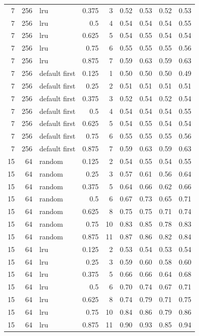 \begin{longtable}{@{}rrlrrrrrr@{}}
7 & 256 & lru & 0.375 & 3 & 0.52 & 0.53 & 0.52 & 0.53 \\
7 & 256 & lru & 0.5 & 4 & 0.54 & 0.54 & 0.54 & 0.55 \\
7 & 256 & lru & 0.625 & 5 & 0.54 & 0.55 & 0.54 & 0.54 \\
7 & 256 & lru & 0.75 & 6 & 0.55 & 0.55 & 0.55 & 0.56 \\
7 & 256 & lru & 0.875 & 7 & 0.59 & 0.63 & 0.59 & 0.63 \\
7 & 256 & default first & 0.125 & 1 & 0.50 & 0.50 & 0.50 & 0.49 \\
7 & 256 & default first & 0.25 & 2 & 0.51 & 0.51 & 0.51 & 0.51 \\
7 & 256 & default first & 0.375 & 3 & 0.52 & 0.54 & 0.52 & 0.54 \\
7 & 256 & default first & 0.5 & 4 & 0.54 & 0.54 & 0.54 & 0.55 \\
7 & 256 & default first & 0.625 & 5 & 0.54 & 0.55 & 0.54 & 0.54 \\
7 & 256 & default first & 0.75 & 6 & 0.55 & 0.55 & 0.55 & 0.56 \\
7 & 256 & default first & 0.875 & 7 & 0.59 & 0.63 & 0.59 & 0.63 \\
15 & 64 & random & 0.125 & 2 & 0.54 & 0.55 & 0.54 & 0.55 \\
15 & 64 & random & 0.25 & 3 & 0.57 & 0.61 & 0.56 & 0.64 \\
15 & 64 & random & 0.375 & 5 & 0.64 & 0.66 & 0.62 & 0.66 \\
15 & 64 & random & 0.5 & 6 & 0.67 & 0.73 & 0.65 & 0.71 \\
15 & 64 & random & 0.625 & 8 & 0.75 & 0.75 & 0.71 & 0.74 \\
15 & 64 & random & 0.75 & 10 & 0.83 & 0.85 & 0.78 & 0.83 \\
15 & 64 & random & 0.875 & 11 & 0.87 & 0.86 & 0.82 & 0.84 \\
15 & 64 & lru & 0.125 & 2 & 0.53 & 0.54 & 0.53 & 0.54 \\
15 & 64 & lru & 0.25 & 3 & 0.59 & 0.60 & 0.58 & 0.60 \\
15 & 64 & lru & 0.375 & 5 & 0.66 & 0.66 & 0.64 & 0.68 \\
15 & 64 & lru & 0.5 & 6 & 0.70 & 0.74 & 0.67 & 0.71 \\
15 & 64 & lru & 0.625 & 8 & 0.74 & 0.79 & 0.71 & 0.75 \\
15 & 64 & lru & 0.75 & 10 & 0.84 & 0.86 & 0.79 & 0.86 \\
15 & 64 & lru & 0.875 & 11 & 0.90 & 0.93 & 0.85 & 0.94 \\

\end{longtable}
